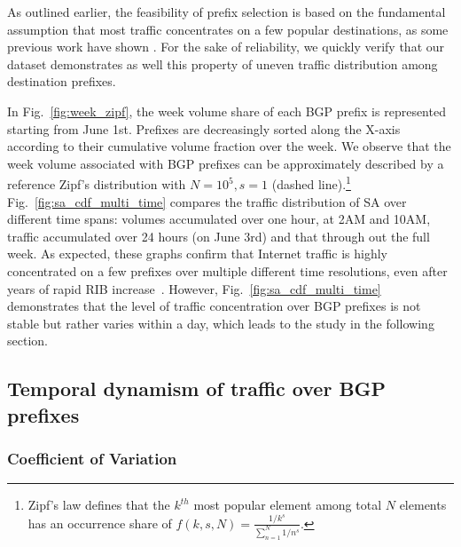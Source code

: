 As outlined earlier, the feasibility of prefix selection is based on the fundamental assumption that most traffic concentrates on a few popular destinations, as some previous work have shown \cite{Fang1999,Feamster2003, Wallerich2006}. For the sake of reliability, we quickly verify that our dataset demonstrates as well this property of uneven traffic distribution among destination prefixes.

In Fig.~\ref{fig:week_zipf}, the week volume share of each BGP prefix is represented starting from June 1st.
Prefixes are decreasingly sorted along the X-axis according to their cumulative volume fraction over the week.
We observe that the week volume associated with BGP prefixes can be approximately described by a reference Zipf's distribution with $N=10^5, s=1$ (dashed line).\footnote{Zipf's law defines that the $k^{th}$ most popular element among total $N$ elements has an occurrence share of $f(k,s,N)=\frac{1/k^s}{\sum_{n=1}^{N}1/n^s}$.} 
Fig.~\ref{fig:sa_cdf_multi_time} compares the traffic distribution of SA over different time spans: volumes accumulated over one hour, at 2AM and 10AM, traffic accumulated over 24 hours (on June 3rd) and that through out the full week.
As expected, these graphs confirm that Internet traffic is highly concentrated on a few prefixes over multiple different time resolutions, even after years of rapid RIB increase~\cite{potaroo}.
However, Fig.~\ref{fig:sa_cdf_multi_time} demonstrates that the level of traffic concentration over BGP prefixes is not stable but rather varies within a day, which leads to the study in the following section.

\subsection{Temporal dynamism of traffic over BGP prefixes}
\label{sec:dyna}

\subsubsection{Coefficient of Variation}

